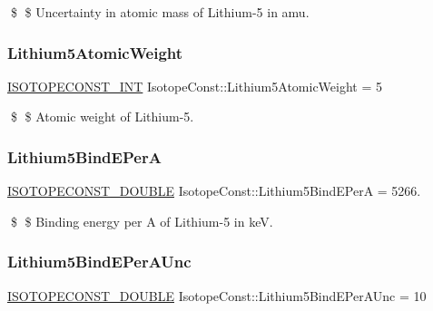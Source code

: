\$ \$ Uncertainty in atomic mass of Lithium-\/5 in amu. \mbox{\label{group___isotope_const-_lithium-_li5_ga4fcf3b184ee97f936398fef4dbd4e996}} 
\subsubsection{\texorpdfstring{Lithium5\+Atomic\+Weight}{Lithium5AtomicWeight}}
{\footnotesize\ttfamily \mbox{\hyperlink{group___isotope_const-_macros_ga5f18360b3e99483a35c32d789e62621c}{I\+S\+O\+T\+O\+P\+E\+C\+O\+N\+S\+T\+\_\+\+I\+NT}} Isotope\+Const\+::\+Lithium5\+Atomic\+Weight = 5}

\$ \$ Atomic weight of Lithium-\/5. \mbox{\label{group___isotope_const-_lithium-_li5_ga168a5ad091e8c5f12a3eed108eec2498}} 
\subsubsection{\texorpdfstring{Lithium5\+Bind\+E\+PerA}{Lithium5BindEPerA}}
{\footnotesize\ttfamily \mbox{\hyperlink{group___isotope_const-_macros_ga8f45a7272ce02c0b4c65c44636ed719a}{I\+S\+O\+T\+O\+P\+E\+C\+O\+N\+S\+T\+\_\+\+D\+O\+U\+B\+LE}} Isotope\+Const\+::\+Lithium5\+Bind\+E\+PerA = 5266.}

\$ \$ Binding energy per A of Lithium-\/5 in keV. \mbox{\label{group___isotope_const-_lithium-_li5_ga41bf95671962b626d9bdb82a1fea9a34}} 
\subsubsection{\texorpdfstring{Lithium5\+Bind\+E\+Per\+A\+Unc}{Lithium5BindEPerAUnc}}
{\footnotesize\ttfamily \mbox{\hyperlink{group___isotope_const-_macros_ga8f45a7272ce02c0b4c65c44636ed719a}{I\+S\+O\+T\+O\+P\+E\+C\+O\+N\+S\+T\+\_\+\+D\+O\+U\+B\+LE}} Isotope\+Const\+::\+Lithium5\+Bind\+E\+Per\+A\+Unc = 10}


